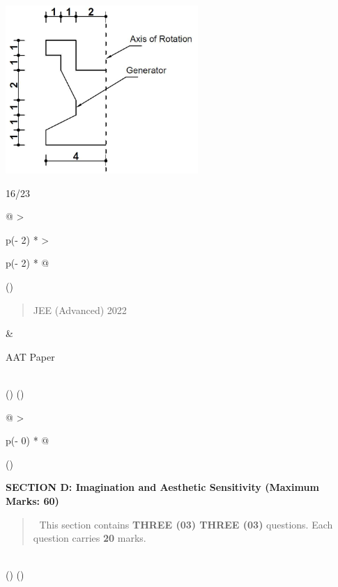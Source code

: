 \documentclass[
]{article}
\begin{document}
\includegraphics[width=2.87083in,height=2.51111in]{vertopal_2361032064654423b71b7db67d98c753/media/image17.png}

16/23

\begin{longtable}[]{@{}
  >{\raggedright\arraybackslash}p{(\columnwidth - 2\tabcolsep) * }
  >{\raggedright\arraybackslash}p{(\columnwidth - 2\tabcolsep) * }@{}}
\toprule()
\begin{minipage}[b]{\linewidth}\raggedright
\begin{quote}
JEE (Advanced) 2022
\end{quote}
\end{minipage} & \begin{minipage}[b]{\linewidth}\raggedright
AAT Paper
\end{minipage} \\
\midrule()
\endhead
\bottomrule()
\end{longtable}

\begin{longtable}[]{@{}
  >{\raggedright\arraybackslash}p{(\columnwidth - 0\tabcolsep) * }@{}}
\toprule()
\begin{minipage}[b]{\linewidth}\raggedright
\textbf{SECTION D: Imagination and Aesthetic Sensitivity (Maximum Marks:
60)}

\begin{quote}
 This section contains \textbf{THREE (03) THREE (03)} questions. Each
question carries \textbf{20} marks.
\end{quote}
\end{minipage} \\
\midrule()
\endhead
\bottomrule()
\end{longtable}
\end{document}
